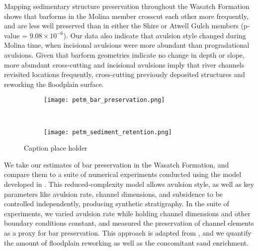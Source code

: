 \documentclass[draft]{compact_proposal}\usepackage[]{graphicx}\usepackage[]{color}
\begin{document}
Mapping sedimentary structure preservation throughout the Wasatch Formation shows that barforms in the Molina member crosscut each other more frequently, and are less well preserved than in either the Shire or Atwell Gulch members (p-value = \ensuremath{9.08\times 10^{-6}}).
Our data also indicate that avulsion style changed during Molina time, when incisional avulsions were more abundant than progradational avulsions. 
Given that barform geometries indicate no change in depth or slope, more abundant cross-cutting and incisional avulsions imply that river channels revisited locations frequently, cross-cutting previously deposited structures and reworking the floodplain surface.


\begin{figure}[H]  
  \centering
  \begin{subfigure}[t]{0.4\textwidth}
  \centering
  \texttt{[image: petm\_bar\_preservation.png]}
  \end{subfigure}
  ~ 
  \begin{subfigure}[t]{0.4\textwidth}
  \centering
  \texttt{[image: petm\_sediment\_retention.png]}
  \end{subfigure}
  \caption{Caption place holder}
  \label{fig:paleo_preservation}
\end{figure}

We take our estimates of bar preservation in the Wasatch Formation, and compare them to a suite of numerical experiments conducted using the model developed in \textcite{chamberlin_interpreting_2015}. 
This reduced-complexity model allows avulsion style, as well as key parameters like avulsion rate, channel dimensions, and subsidence to be controlled independently, producing synthetic stratigraphy. 
In the suite of experiments, we varied avulsion rate while holding channel dimensions and other boundary conditions constant, and measured the preservation of channel elements as a proxy for bar preservation. 
This approach is adapted from \textcite{chamberlin_using_2019}, and we quantify the amount of floodplain reworking as well as the concomitant sand enrichment.
\end{document}
